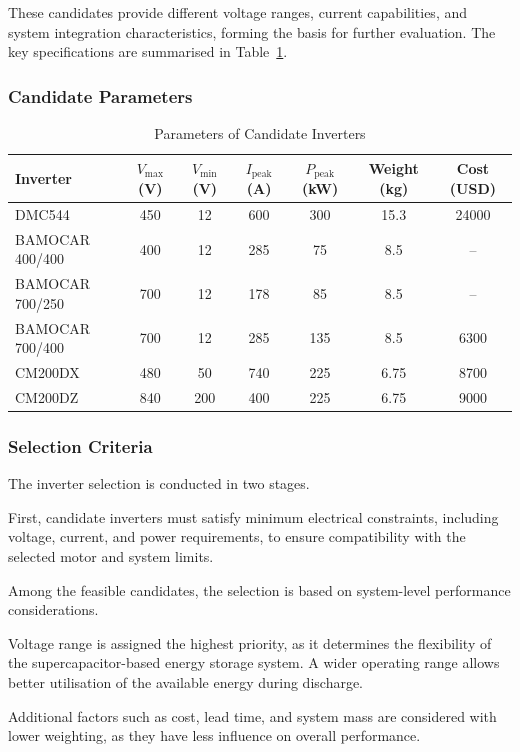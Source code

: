 \documentclass[a4paper,12pt]{article}
\begin{document}
These candidates provide different voltage ranges, current capabilities, and system integration characteristics, forming the basis for further evaluation. The key specifications are summarised in Table~\ref{tab:inverter_parameters}.

\subsubsection{Candidate Parameters}

\begin{table}[H]
\centering
\caption{Parameters of Candidate Inverters}
\label{tab:inverter_parameters}
\begin{tabular}{lcccccc}
\toprule
Inverter & $V_{\text{max}}$ (V) & $V_{\text{min}}$ (V) & $I_{\text{peak}}$ (A) & $P_{\text{peak}}$ (kW) & Weight (kg) & Cost (USD) \\
\midrule
DMC544 & 450 & 12 & 600 & 300 & 15.3 & 24000 \\
BAMOCAR 400/400 & 400 & 12 & 285 & 75 & 8.5 & -- \\
BAMOCAR 700/250 & 700 & 12 & 178 & 85 & 8.5 & -- \\
BAMOCAR 700/400 & 700 & 12 & 285 & 135 & 8.5 & 6300 \\
CM200DX & 480 & 50 & 740 & 225 & 6.75 & 8700 \\
CM200DZ & 840 & 200 & 400 & 225 & 6.75 & 9000 \\
\bottomrule
\end{tabular}
\end{table}

\subsubsection{Selection Criteria}

The inverter selection is conducted in two stages.

First, candidate inverters must satisfy minimum electrical constraints, including voltage, current, and power requirements, to ensure compatibility with the selected motor and system limits.

Among the feasible candidates, the selection is based on system-level performance considerations.

Voltage range is assigned the highest priority, as it determines the flexibility of the supercapacitor-based energy storage system. A wider operating range allows better utilisation of the available energy during discharge.

Additional factors such as cost, lead time, and system mass are considered with lower weighting, as they have less influence on overall performance.
\end{document}
